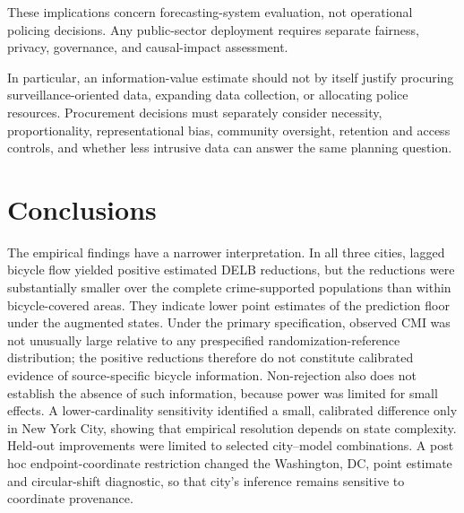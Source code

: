 \documentclass[applsci,article,accept,moreauthors]{Definitions/mdpi}
\begin{document}
These implications concern forecasting-system evaluation, not operational
policing decisions. Any public-sector deployment requires separate fairness,
privacy, governance, and causal-impact assessment.

{In particular, an information-value estimate should not by itself justify
procuring surveillance-oriented data, expanding data collection, or allocating
police resources. Procurement decisions must separately consider necessity,
proportionality, representational bias, community oversight, retention and
access controls, and whether less intrusive data can answer the same planning
question.}

\section{Conclusions}
\label{sec:conclusions}


{The empirical findings have a narrower interpretation. In all three
cities, lagged bicycle flow yielded positive estimated DELB reductions, but
the reductions were substantially smaller over the complete crime-supported
populations than within bicycle-covered areas. They indicate lower point
estimates of the prediction floor under the augmented states. Under the
primary specification, observed CMI was not unusually large relative to any
prespecified randomization-reference distribution; the positive reductions
therefore do not constitute calibrated
evidence of source-specific bicycle information. Non-rejection also does not
establish the absence of such information, because power was limited for
small effects. A lower-cardinality sensitivity identified a small, calibrated
difference only in New York City, showing that empirical resolution depends
on state complexity. Held-out improvements were limited to selected
city--model combinations. A post hoc endpoint-coordinate restriction changed
the Washington, DC, point estimate and circular-shift diagnostic, so that
city's inference remains sensitive to coordinate provenance.}
\end{document}
